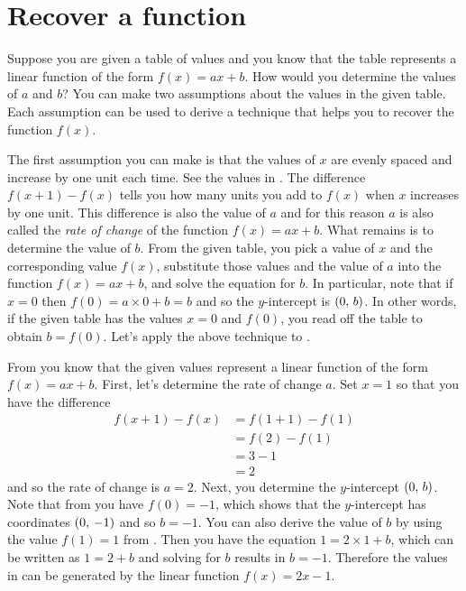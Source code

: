 \documentclass[a4paper,oneside,12pt]{article}
\begin{document}

\section{Recover a function}

Suppose you are given a table of values and you know that the table
represents a linear function of the form $f(x) = ax + b$.  How would
you determine the values of $a$ and $b$?  You can make two assumptions
about the values in the given table.  Each assumption can be used to
derive a technique that helps you to recover the function $f(x)$.

The first assumption you can make is that the values of $x$ are evenly
spaced and increase by one unit each time.  See the values in
.  The difference
$f(x + 1) - f(x)$ tells you how many units you add to $f(x)$ when $x$
increases by one unit.  This difference is also the value of $a$ and
for this reason $a$ is also called the \emph{rate of change} of the
function $f(x) = ax + b$.  What remains is to determine the value of
$b$.  From the given table, you pick a value of $x$ and the
corresponding value $f(x)$, substitute those values and the value of
$a$ into the function $f(x) = ax + b$, and solve the equation for
$b$.  In particular, note that if $x = 0$ then
$f(0) = a \times 0 + b = b$ and so the $y$-intercept is
$\left\lparen{0},\, {b}\right\rparen$.  In other words, if the given table has the values
$x = 0$ and $f(0)$, you read off the table to obtain $b = f(0)$.
Let's apply the above technique to
.

\begin{table}[!htbp]
\centering

\caption{%
  Some values of a linear function $f(x) = ax + b$.
}
\label{tab:function_values_a_2_b_minus_1}
\end{table}

From  you know that the given
values represent a linear function of the form $f(x) = ax + b$.
First, let's determine the rate of change $a$.  Set $x = 1$ so that
you have the difference
\begin{align*}
f(x + 1) - f(x)
&=
f(1 + 1) - f(1) \\[4pt]
&=
f(2) - f(1) \\[4pt]
&=
3 - 1 \\[4pt]
&=
2
\end{align*}
and so the rate of change is $a = 2$.  Next, you determine the
$y$-intercept $\left\lparen{0},\, {b}\right\rparen$.  Note that from
 you have
$f(0) = -1$, which shows that the $y$-intercept has coordinates
$\left\lparen{0},\, {-1}\right\rparen$ and so $b = -1$.  You can also derive the value of $b$
by using the value $f(1) = 1$ from
.  Then you have the equation
$1 = 2 \times 1 + b$, which can be written as $1 = 2 + b$ and solving
for $b$ results in $b = -1$.  Therefore the values in
 can be generated by the
linear function $f(x) = 2x - 1$.
\end{document}

